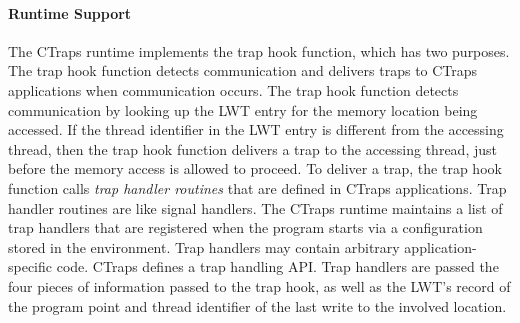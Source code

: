 \documentclass[preprint,10pt]{sigplanconf}
\newcommand{\ctraps}{CTraps\xspace}
\newcommand{\lwt}{LWT\xspace}
\begin{document}
\paragraph{Runtime Support}
The \ctraps runtime implements the trap hook function,  which has two purposes.
The trap hook function detects communication and delivers traps to \ctraps
applications when communication occurs.  The trap hook function detects
communication by looking up the \lwt entry for the memory location being
accessed.  If the thread identifier in the \lwt entry is different from the
accessing thread, then the trap hook function delivers a trap to the accessing
thread, just before the memory access is allowed to proceed.  To deliver a
trap, the trap hook function calls {\em trap handler routines} that are defined
in \ctraps applications.  Trap handler routines are like signal handlers.  The
\ctraps runtime maintains a list of trap handlers that are registered when the
program starts via a configuration stored in the environment.  Trap handlers
may contain arbitrary application-specific code.  \ctraps defines a trap
handling API.  Trap handlers are passed the four pieces of information passed
to the trap hook, as well as the \lwt's record of the program point and thread
identifier of the last write to the involved location.

\end{document}
